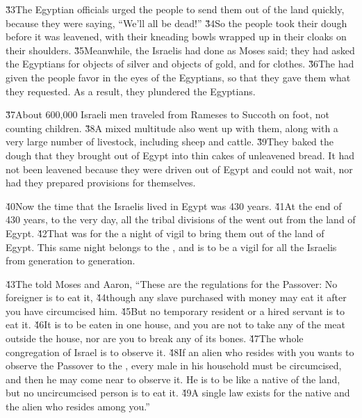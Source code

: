 \v{33}The Egyptian officials urged the people to send them out of the land quickly, because they were saying, ``We'll all be dead!'' \v{34}So the people took their dough before it was leavened, with their kneading bowls wrapped up in their cloaks on their shoulders. \v{35}Meanwhile, the Israelis had done as Moses said; they had asked the Egyptians for objects of silver and objects of gold, and for clothes. \v{36}The  had given the people favor in the eyes of the Egyptians, so that they gave them what they requested. As a result, they plundered the Egyptians.

\v{37}About 600,000 Israeli men traveled from Rameses to Succoth on foot, not counting children. \v{38}A mixed multitude also went up with them, along with a very large number of livestock, including sheep and cattle. \v{39}They baked the dough that they brought out of Egypt into thin cakes of unleavened bread. It had not been leavened because they were driven out of Egypt and could not wait, nor had they prepared provisions for themselves.

\v{40}Now the time that the Israelis lived in Egypt was 430 years. \v{41}At the end of 430 years, to the very day, all the tribal divisions of the  went out from the land of Egypt. \v{42}That was for the  a night of vigil to bring them out of the land of Egypt. This same night belongs to the , and is to be a vigil for all the Israelis from generation to generation.

\v{43}The  told Moses and Aaron, ``These are the regulations for the Passover: No foreigner is to eat it, \v{44}though any slave purchased with money may eat it after you have circumcised him. \v{45}But no temporary resident or a hired servant is to eat it. \v{46}It is to be eaten in one house, and you are not to take any of the meat outside the house, nor are you to break any of its bones. \v{47}The whole congregation of Israel is to observe it. \v{48}If an alien who resides with you wants to observe the Passover to the , every male in his household must be circumcised, and then he may come near to observe it. He is to be like a native of the land, but no uncircumcised person is to eat it. \v{49}A single law exists for the native and the alien who resides among you.''

